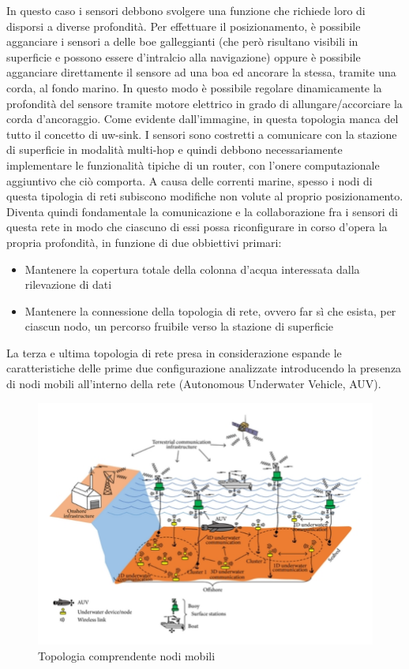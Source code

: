 \documentclass[Lau,binding=0.6cm]{sapthesis}
\begin{document}
In questo caso i sensori debbono svolgere una funzione che richiede loro di disporsi a diverse profondità. Per effettuare il posizionamento, è possibile agganciare i sensori a delle boe galleggianti (che però risultano visibili in superficie e possono essere d'intralcio alla navigazione) oppure è possibile agganciare direttamente il sensore ad una boa ed ancorare la stessa, tramite una corda, al fondo marino.  In questo modo è possibile regolare dinamicamente la profondità del sensore tramite motore elettrico in grado di allungare/accorciare la corda d'ancoraggio. Come evidente dall'immagine, in questa topologia manca del tutto il concetto di uw-sink. I sensori sono costretti a comunicare con la stazione di superficie in modalità multi-hop e quindi debbono necessariamente implementare le funzionalità tipiche di un router, con l'onere computazionale aggiuntivo che ciò comporta. A causa delle correnti marine, spesso i nodi di questa tipologia di reti subiscono modifiche non volute al proprio posizionamento. Diventa quindi fondamentale la comunicazione e la collaborazione fra i sensori di questa rete in modo che ciascuno di essi possa riconfigurare in corso d'opera la propria profondità, in funzione di due obbiettivi primari:
\begin{itemize}

 \item Mantenere la copertura totale della colonna d'acqua interessata dalla rilevazione di dati 

\item Mantenere la connessione della topologia di rete, ovvero far sì che esista, per ciascun nodo, un percorso fruibile verso la stazione di superficie
\end{itemize}

La terza e ultima topologia di rete presa in considerazione espande le caratteristiche delle prime due configurazione analizzate introducendo la presenza di nodi mobili all'interno della rete (Autonomous Underwater Vehicle, AUV).

\begin{figure}[h]
	\includegraphics[width=\linewidth]{auv_arch.png}
	\caption{ Topologia comprendente nodi mobili}
	\label{fig:}
\end{figure}
\end{document}
